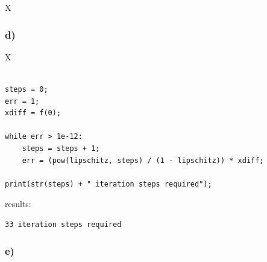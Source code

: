 X



\subsubsection{d)}

X

\begin{lstlisting}[caption=todo]

steps = 0;
err = 1;
xdiff = f(0);

while err > 1e-12:
	steps = steps + 1;
	err = (pow(lipschitz, steps) / (1 - lipschitz)) * xdiff;

print(str(steps) + " iteration steps required");

\end{lstlisting}


results:

\begin{lstlisting}[caption=Result of 1.1 a), keywordstyle=\color{black}]
33 iteration steps required
\end{lstlisting}


\subsubsection{e)}

